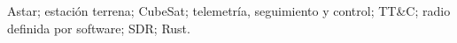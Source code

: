 Astar; estación terrena; CubeSat; telemetría, seguimiento y control; TT\&C; radio definida por software; SDR; Rust.